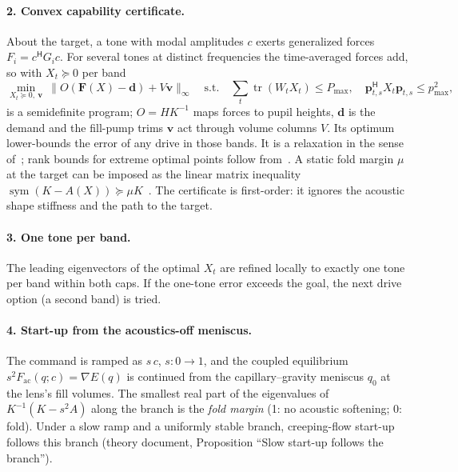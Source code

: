 \documentclass[11pt,a4paper]{article}
\numberwithin{equation}{section}
\DeclareMathOperator{\tr}{tr}
\DeclareMathOperator{\sym}{sym}
\begin{document}
\paragraph{2. Convex capability certificate.} About the target, a tone with modal
amplitudes $c$ exerts generalized forces $F_i=c^{\mathsf H}G_ic$. For several
tones at distinct frequencies the time-averaged forces add, so with
$X_t\succeq0$ per band
\begin{equation}
 \min_{X_t\succeq0,\ \bm v}\ \bigl\lVert O(\bm F(X)-\bm d)+V\bm v\bigr\rVert_\infty
 \quad\text{s.t.}\quad \textstyle\sum_t\tr(W_tX_t)\le P_{\max},\quad
 \bm p_{t,s}^{\mathsf H}X_t\bm p_{t,s}\le p_{\max}^2,
 \label{eq:capability}
\end{equation}
is a semidefinite program; $O=HK^{-1}$ maps forces to pupil heights, $\bm d$ is
the demand and the fill-pump trims $\bm v$ act through volume columns $V$. Its
optimum lower-bounds the error of any drive in those bands. It is a relaxation in
the sense of~\cite{luo2010}; rank bounds for extreme optimal points follow
from~\cite{barvinok1995,pataki1998}. A static fold margin $\mu$ at the target
can be imposed as the linear matrix inequality
$\sym(K-A(X))\succeq\mu K$~\cite{boyd1994}. The certificate is first-order: it
ignores the acoustic shape stiffness and the path to the target.

\paragraph{3. One tone per band.} The leading eigenvectors of the optimal $X_t$
are refined locally to exactly one tone per band within both caps. If the
one-tone error exceeds the goal, the next drive option (a second band) is tried.

\paragraph{4. Start-up from the acoustics-off meniscus.} The command is ramped
as $s\,c$, $s:0\to1$, and the coupled equilibrium
$s^2F_{\mathrm{ac}}(q;c)=\nabla E(q)$ is continued from the capillary--gravity
meniscus $q_0$ at the lens's fill volumes. The smallest real part of the
eigenvalues of $K^{-1}(K-s^2A)$ along the branch is the \emph{fold margin} (1:
no acoustic softening; 0: fold). Under a slow ramp and a uniformly stable branch,
creeping-flow start-up follows this branch (theory document, Proposition
\enquote{Slow start-up follows the branch}).
\end{document}
